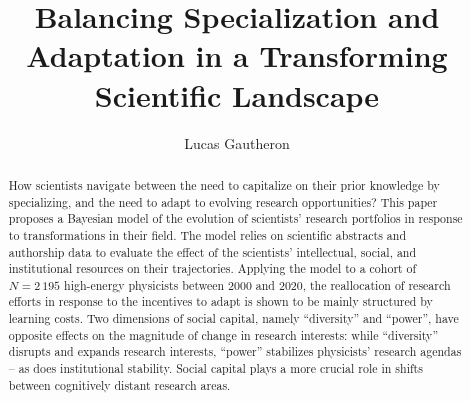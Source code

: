 \documentclass{article}
\title{Balancing Specialization and Adaptation in a Transforming Scientific Landscape}
\author{Lucas Gautheron}
\date{}
\begin{document}
\maketitle


\begin{abstract}
    How scientists navigate between the need to capitalize on their prior knowledge by specializing, and the need to adapt to evolving research opportunities? This paper proposes a Bayesian model of the evolution of scientists' research portfolios in response to transformations in their field. The model relies on scientific abstracts and authorship data to evaluate the effect of the scientists' intellectual, social, and institutional resources on their trajectories. Applying the model to a cohort of $N=2\,195$ high-energy physicists between 2000 and 2020, 
    the reallocation of research efforts in response to the incentives to adapt is shown to be mainly structured by learning costs. Two dimensions of social capital, namely ``diversity'' and ``power'', have opposite effects on the magnitude of change in research interests: while ``diversity'' disrupts and expands research interests, ``power'' stabilizes physicists' research agendas -- as does institutional stability. Social capital plays a more crucial role in shifts between cognitively distant research areas.
\end{abstract}
\end{document}
